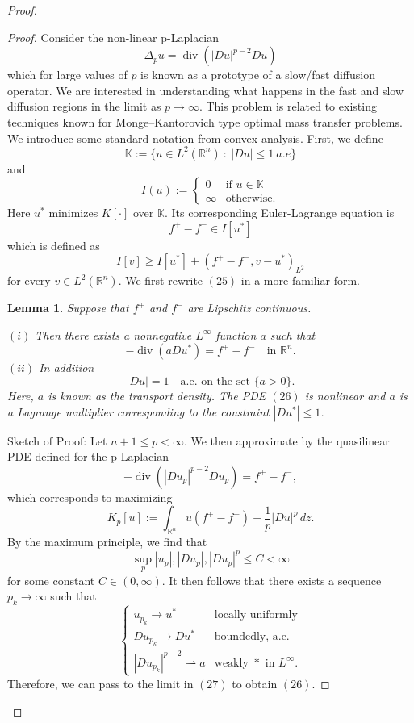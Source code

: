 \documentclass{article}
\newtheorem{lemma}[theorem]{Lemma}
\begin{document}
\begin{flushleft}
\begin{proof}
\begin{proof}
Consider the non-linear p-Laplacian
$$\Delta_p u = \operatorname{div}(|Du|^{p-2}Du)$$
which for large values of $p$ is known as a prototype of a slow/fast diffusion operator. We are interested in understanding what happens in the fast and slow diffusion regions in the limit as $p\to\infty$. This problem is related to existing techniques known for Monge–Kantorovich type optimal
mass transfer problems. We introduce some standard notation from convex analysis. First, we define
$$\mathbb K := \{u\in L^2(\mathbb R^n)~ : ~|Du| \leq 1~a.e\}$$
and
$$I(u):=
  \begin{cases} 
      0 & \text{if $u\in \mathbb K$} \\
      \infty & \text{otherwise}.
   \end{cases}
$$
Here $u^*$ minimizes $K[\cdot]$ over $\mathbb K$. Its corresponding Euler-Lagrange equation is
\begin{equation}f^+ - f^- \in I[u^*]\end{equation}
which is defined as
$$I[v] \geq I[u^*] + (f^+ - f^-, v-u^*)_{L^2}$$
for every $v\in L^2(\mathbb R^n)$. We first rewrite $(25)$ in a more familiar form.
\newline
\begin{lemma}
Suppose that $f^+$ and $f^-$ are Lipschitz continuous. 

$(i)$ Then there exists a nonnegative $L^{\infty}$ function $a$ such that
\begin{equation}-\operatorname{div}(aDu^*)=f^+ - f^- \quad \text{in $\mathbb R^n$}.\end{equation}
$(ii)$ In addition
$$|Du|=1\quad \text{a.e. on the set $\{a>0\}$.}$$
Here, $a$ is known as the transport density. The PDE $(26)$ is nonlinear and $a$ is a Lagrange multiplier corresponding to the constraint $|Du^*|\leq 1$.
\end{lemma}

Sketch of Proof: Let $n+1 \leq p < \infty$. We then approximate by the quasilinear PDE defined for the p-Laplacian
\begin{equation}-\operatorname{div}(|Du_p|^{p-2}Du_p)= f^+ - f^-,\end{equation}
which corresponds to maximizing 
$$K_p[u]:=\int_{\mathbb R^n} u\left(f^+ - f^-\right) -\frac{1}{p}|Du|^p \, dz.$$
By the maximum principle, we find that
$$\sup_p |u_p|,|Du_p|,|Du_p|^p \leq C < \infty$$
for some constant $C\in(0,\infty)$. It then follows that there exists a sequence $p_k \to \infty$ such that
$$
  \begin{cases} 
      u_{p_k} \to u^* & \text{locally uniformly} \\
      Du_{p_k} \to Du^* & \text{boundedly, a.e.} \\
      |Du_{p_k}|^{p-2} \rightharpoonup a & \text{weakly $*$ in $L^{\infty}$}.
   \end{cases}
$$
Therefore, we can pass to the limit in $(27)$ to obtain $(26)$. 


\end{proof}
\end{proof}
\end{flushleft}
\end{document}
